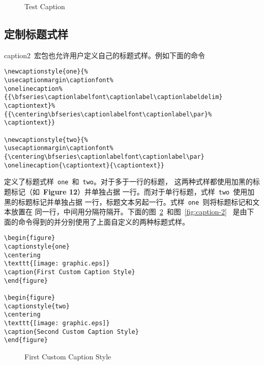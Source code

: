 \begin{figure} 
	\renewcommand{\captionfont}{\Large \bfseries \sffamily} 
	\renewcommand{\captionlabelfont}{\small} 
	\centering 
	\resizebox{2in}{!}{\usebox{\graphic}}
	\caption{Test Caption}\label{fig:captionfont-1}
\end{figure}

\subsection{定制标题式样}

\textsf{caption2}~宏包也允许用户定义自己的标题式样。例如下面的命令
\begin{Verbatim}[xleftmargin=1cm]
\newcaptionstyle{one}{% 
\usecaptionmargin\captionfont% 
\onelinecaption% 
{{\bfseries\captionlabelfont\captionlabel\captionlabeldelim} 
\captiontext}% 
{{\centering\bfseries\captionlabelfont\captionlabel\par}%
\captiontext}} 

\newcaptionstyle{two}{% 
\usecaptionmargin\captionfont% 
{\centering\bfseries\captionlabelfont\captionlabel\par} 
\onelinecaption{\captiontext}{\captiontext}}
\end{Verbatim}
定义了标题式样~\texttt{one}~和~\texttt{two}。对于多于一行的标题，
这两种式样都使用加黑的标题标记（如~\textbf{Figure 12}）并单独占据
一行。而对于单行标题，式样~\texttt{two}~使用加黑的标题标记并单独占据
一行，标题文本另起一行。式样~\texttt{one}~则将标题标记和文本放置在
同一行，中间用分隔符隔开。下面的图~\ref{fig:caption-1}~和图~\ref{fig:caption-2}
~是由下面的命令得到的并分别使用了上面自定义的两种标题式样。
\begin{Verbatim}[xleftmargin=1cm]
\begin{figure} 
\captionstyle{one} 
\centering 
\texttt{[image: graphic.eps]} 
\caption{First Custom Caption Style} 
\end{figure} 

\begin{figure} 
\captionstyle{two} 
\centering 
\texttt{[image: graphic.eps]} 
\caption{Second Custom Caption Style} 
\end{figure}
\end{Verbatim}

\begin{figure} 
	\centering 
	\resizebox{2in}{!}{\usebox{\graphic}}
	\caption{First Custom Caption Style}\label{fig:caption-1} 
\end{figure} 

